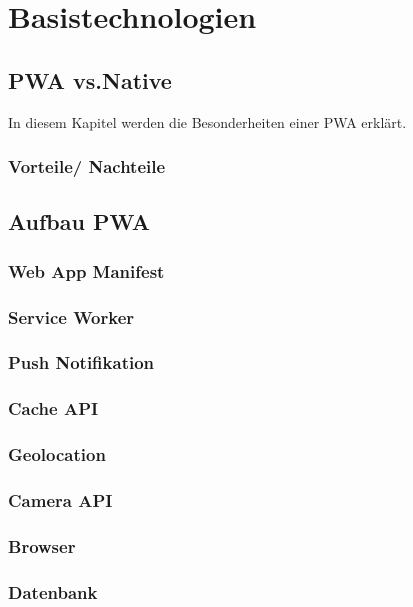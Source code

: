 \chapter{Basistechnologien}
\thispagestyle{standard}
\pagestyle{standard}
\renewcommand{\footrulewidth}{0.4pt}

\section{PWA vs.Native}

In diesem Kapitel werden die Besonderheiten einer PWA erklärt.


\subsection{Vorteile/ Nachteile}


\section{Aufbau PWA}

\subsection{Web App Manifest}


\subsection{Service Worker}


\subsection{Push Notifikation}


\subsection{Cache API}

\subsection{Geolocation}



\subsection{Camera API}

\subsection{Browser} 


\subsection{Datenbank}

\newpage